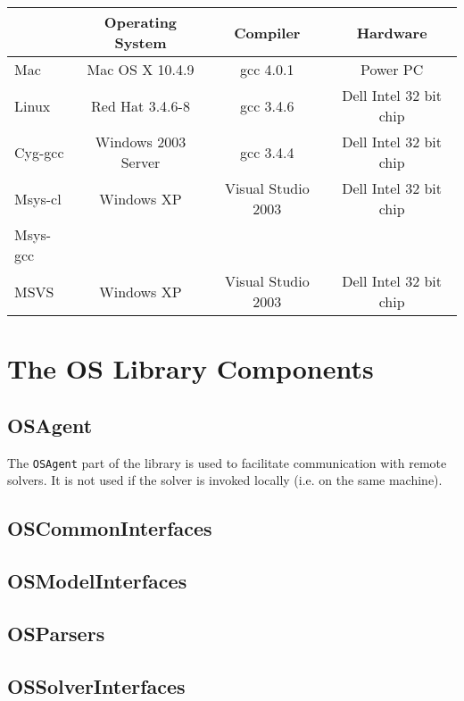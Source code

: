 \documentclass[12pt]{article}
\renewcommand{\_}{{\char"5F}}
\renewcommand{\{}{{\char"7B}}
\renewcommand{\}}{{\char"7D}}
\renewcommand{\^}{{\char"0D}}
\renewcommand{\'}{{\char"0D}}
\begin{document}
 
 {\large
 }
 
 \vskip 12pt
 
 \begin{tabular}{l|c|c|c|}
 & {\bf Operating System} & {\bf Compiler} & {\bf  Hardware} \\ \hline
 Mac &Mac OS X 10.4.9&gcc 4.0.1&Power PC \\   \hline
 Linux &Red Hat 3.4.6-8&gcc 3.4.6& Dell Intel 32 bit chip\\ \hline
 Cyg-gcc &Windows 2003 Server&gcc 3.4.4& Dell Intel 32 bit chip \\ \hline
 Msys-cl &Windows XP&Visual Studio 2003 &Dell Intel 32 bit chip \\ \hline
 Msys-gcc &&& \\ \hline
 MSVS &Windows XP&Visual Studio 2003 &Dell Intel 32 bit chip \\ \hline

 \end{tabular}
 



\section{The OS Library Components}

\subsection{OSAgent}

The {\tt OSAgent}  part of the library is used to facilitate communication with remote solvers. It is not used if the solver is invoked locally (i.e. on the same machine). 

\subsection{OSCommonInterfaces}

\subsection{OSModelInterfaces}



\subsection{OSParsers}



\subsection{OSSolverInterfaces}
\end{document}
